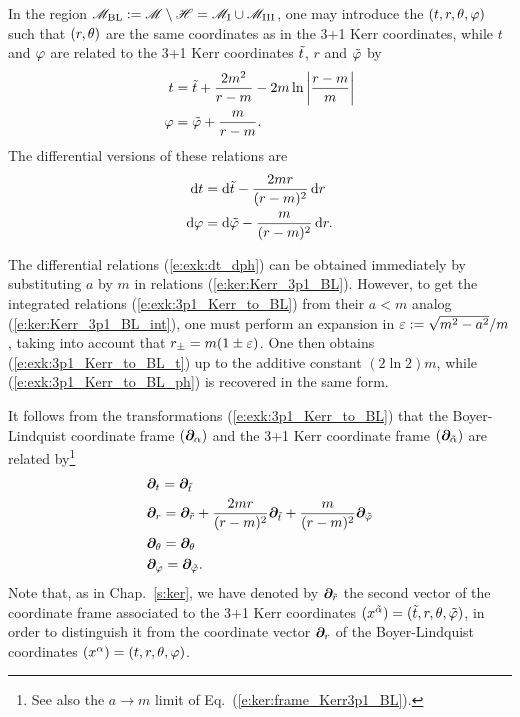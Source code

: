 In the region $\mathscr{M}_{\rm BL}:= \mathscr{M} \setminus \mathscr{H} = \mathscr{M}_{\rm I} \cup \mathscr{M}_{\rm III}$, one may introduce
the 
$(t,r,\theta,\varphi)$ such that $(r,\theta)$ are the same coordinates as in the
3+1 Kerr coordinates, while $t$ and $\varphi$ are related to the 3+1 Kerr coordinates
${\tilde t}$, $r$ and ${\tilde\varphi}$ by
\begin{subequations}
\label{e:exk:3p1_Kerr_to_BL}
\begin{align}
    t & = {\tilde t} +  \frac{2m^2}{r - m} - 2m \ln \left| \frac{r - m}{m} \right|
            \label{e:exk:3p1_Kerr_to_BL_t} \\
    \varphi & = {\tilde\varphi} + \frac{m}{r - m} . \label{e:exk:3p1_Kerr_to_BL_ph}
\end{align}
\end{subequations}
The differential versions of these relations are
\begin{subequations}
\label{e:exk:dt_dph}
\begin{align}
    \mathrm{d} t & = \mathrm{d} {\tilde t}  - \frac{2m r}{(r- m)^2} \, \mathrm{d} r \\
    \mathrm{d} \varphi & = \mathrm{d} {\tilde\varphi} - \frac{m}{(r - m)^2 } \, \mathrm{d} r .
\end{align}
\end{subequations}
\begin{remark}
The differential relations (\ref{e:exk:dt_dph}) can be obtained immediately
by substituting $a$ by $m$ in relations (\ref{e:ker:Kerr_3p1_BL}). However, to get the integrated
relations (\ref{e:exk:3p1_Kerr_to_BL}) from their $a<m$ analog
(\ref{e:ker:Kerr_3p1_BL_int}), one must perform an expansion in $\varepsilon := \sqrt{m^2 - a^2}/m$,
taking into account that $r_\pm = m(1\pm\varepsilon)$. One then obtains
(\ref{e:exk:3p1_Kerr_to_BL_t})
up to the additive constant $(2\ln 2) m$, while (\ref{e:exk:3p1_Kerr_to_BL_ph}) is recovered in the same form.
\end{remark}
It follows from the transformations (\ref{e:exk:3p1_Kerr_to_BL}) that
the Boyer-Lindquist coordinate frame $(\bm{\partial}_\alpha)$ and the 3+1 Kerr coordinate frame $(\bm{\partial}_{\tilde{\alpha}})$ are related by\footnote{See also the $a\to m$ limit of Eq.~(\ref{e:ker:frame_Kerr3p1_BL}).}
\begin{subequations}
\label{e:exk:frame_BL_Kerr3p1}
\begin{align}
    & \bm{\partial}_t  = \bm{\partial}_{\tilde t}  \\
    & \bm{\partial}_r = \bm{\partial}_{\tilde r} + \frac{2mr}{(r-m)^2} \bm{\partial}_{\tilde t}
                        + \frac{m}{(r-m)^2} \bm{\partial}_{\tilde\varphi} \\
    & \bm{\partial}_\theta = \bm{\partial}_\theta \\
    & \bm{\partial}_\varphi = \bm{\partial}_{{\tilde\varphi}} .
\end{align}
\end{subequations}
Note that, as in Chap.~\ref{s:ker}, we have denoted by $\bm{\partial}_{\tilde r}$ the second vector of the
coordinate frame associated to the 3+1 Kerr coordinates
$(x^{\tilde{\alpha}}) = ({\tilde t}, r, \theta,{\tilde\varphi})$, in order to distinguish it from
the coordinate vector
$\bm{\partial}_r$ of the Boyer-Lindquist coordinates
$(x^\alpha) = (t,r,\theta,\varphi)$.

